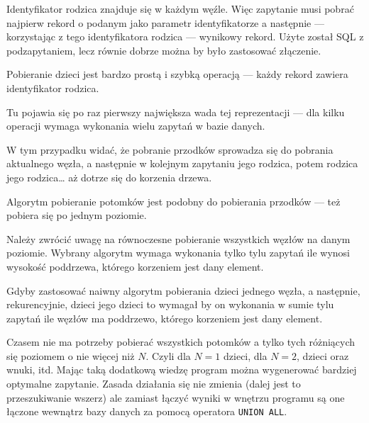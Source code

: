 
Identyfikator rodzica znajduje się w każdym węźle.
Więc zapytanie musi pobrać najpierw rekord o podanym jako parametr identyfikatorze a następnie
--- korzystając z tego identyfikatora rodzica --- wynikowy rekord.
Użyte został SQL z podzapytaniem, lecz równie dobrze można by było zastosować złączenie. 




Pobieranie dzieci jest bardzo prostą i szybką operacją
--- każdy rekord zawiera identyfikator rodzica.



Tu pojawia się po raz pierwszy największa wada tej reprezentacji --- 
dla kilku operacji wymaga wykonania wielu zapytań w bazie danych.

W tym przypadku widać, że pobranie przodków sprowadza się do pobrania aktualnego węzła,
a następnie w kolejnym zapytaniu jego rodzica,
potem rodzica jego rodzica\ldots
aż dotrze się do korzenia drzewa.





Algorytm pobieranie potomków jest podobny do pobierania przodków --- też pobiera się po jednym poziomie.


Należy zwrócić uwagę na równoczesne pobieranie wszystkich węzłów na danym poziomie.
Wybrany algorytm wymaga wykonania tylko tylu zapytań ile wynosi wysokość poddrzewa,
którego korzeniem jest dany element.


Gdyby zastosować naiwny algorytm pobierania dzieci jednego węzła,
a następnie, rekurencyjnie, dzieci jego dzieci
to wymagał by on wykonania w sumie tylu zapytań ile węzłów ma poddrzewo,
którego korzeniem jest dany element.



Czasem nie ma potrzeby pobierać wszystkich potomków a tylko tych różniących się poziomem o nie więcej niż $N$.
Czyli dla $N = 1$ dzieci, dla $N = 2$, dzieci oraz wnuki, itd.
Mając taką dodatkową wiedzę program można wygenerować bardziej optymalne zapytanie.
Zasada działania się nie zmienia (dalej jest to przeszukiwanie wszerz)
ale zamiast łączyć wyniki w wnętrzu programu są one łączone wewnątrz bazy danych za pomocą operatora \texttt{UNION ALL}.

